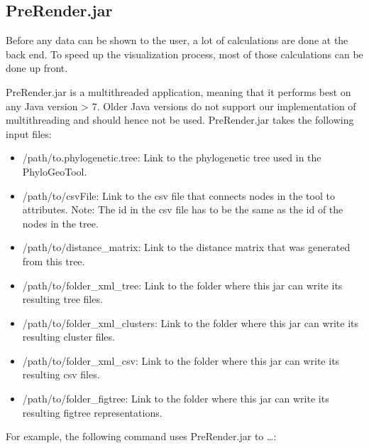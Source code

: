 \documentclass[a4paper, 11pt]{article} %
\begin{document}
\subsection{PreRender.jar}
Before any data can be shown to the user, a lot of calculations are done at the back end. 
To speed up the visualization process, most of those calculations can be done up front.

PreRender.jar is a multithreaded application, meaning that it performs best on any Java version > 7. 
Older Java versions do not support our implementation of multithreading and should hence not be used.
PreRender.jar takes the following input files: %
\begin{itemize}
\item /path/to.phylogenetic.tree: Link to the phylogenetic tree used in the PhyloGeoTool.
\item /path/to/csvFile: Link to the csv file that connects nodes in the tool to attributes. Note: The id in the csv file has to be the same as the id of the nodes in the tree.
\item /path/to/distance\_matrix: Link to the distance matrix that was generated from this tree.
\item /path/to/folder\_xml\_tree: Link to the folder where this jar can write its resulting tree files.
\item /path/to/folder\_xml\_clusters: Link to the folder where this jar can write its resulting cluster files.
\item /path/to/folder\_xml\_csv: Link to the folder where this jar can write its resulting csv files.
\item /path/to/folder\_figtree: Link to the folder where this jar can write its resulting figtree representations.
\end{itemize}

For example, the following command uses PreRender.jar to \ldots: %
\end{document}
